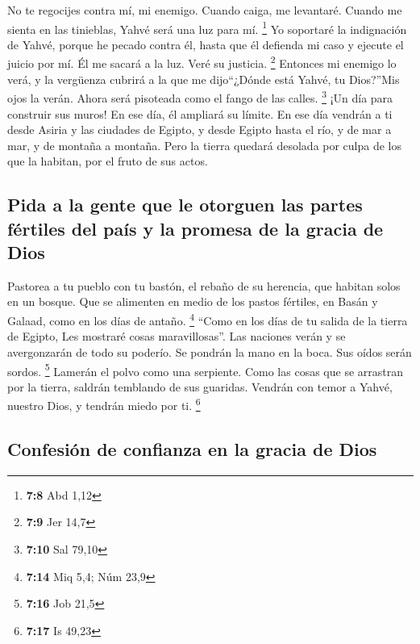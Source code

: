 \begin{paracol}{2}
 No te regocijes contra mí, mi enemigo. Cuando caiga, me
levantaré. Cuando me sienta en las tinieblas, Yahvé será una luz para
mí. \footnote{\textbf{7:8} Abd 1,12}  Yo soportaré la
indignación de Yahvé, porque he pecado contra él, hasta que él defienda
mi caso y ejecute el juicio por mí. Él me sacará a la luz. Veré su
justicia. \footnote{\textbf{7:9} Jer 14,7}  Entonces mi
enemigo lo verá, y la vergüenza cubrirá a la que me dijo``¿Dónde está
Yahvé, tu Dios?''Mis ojos la verán. Ahora será pisoteada como el fango
de las calles. \footnote{\textbf{7:10} Sal 79,10}  ¡Un
día para construir sus muros! En ese día, él ampliará su límite.
 En ese día vendrán a ti desde Asiria y las ciudades de
Egipto, y desde Egipto hasta el río, y de mar a mar, y de montaña a
montaña.  Pero la tierra quedará desolada por culpa de
los que la habitan, por el fruto de sus actos.

\hypertarget{pida-a-la-gente-que-le-otorguen-las-partes-fuxe9rtiles-del-pauxeds-y-la-promesa-de-la-gracia-de-dios}{%
\subsection{Pida a la gente que le otorguen las partes fértiles del país
y la promesa de la gracia de
Dios}\label{pida-a-la-gente-que-le-otorguen-las-partes-fuxe9rtiles-del-pauxeds-y-la-promesa-de-la-gracia-de-dios}}

 Pastorea a tu pueblo con tu bastón, el rebaño de su
herencia, que habitan solos en un bosque. Que se alimenten en medio de
los pastos fértiles, en Basán y Galaad, como en los días de antaño.
\footnote{\textbf{7:14} Miq 5,4; Núm 23,9}  ``Como en los
días de tu salida de la tierra de Egipto, Les mostraré cosas
maravillosas''.  Las naciones verán y se avergonzarán de
todo su poderío. Se pondrán la mano en la boca. Sus oídos serán sordos.
\footnote{\textbf{7:16} Job 21,5}  Lamerán el polvo como
una serpiente. Como las cosas que se arrastran por la tierra, saldrán
temblando de sus guaridas. Vendrán con temor a Yahvé, nuestro Dios, y
tendrán miedo por ti. \footnote{\textbf{7:17} Is 49,23}

\hypertarget{confesiuxf3n-de-confianza-en-la-gracia-de-dios}{%
\subsection{Confesión de confianza en la gracia de
Dios}\label{confesiuxf3n-de-confianza-en-la-gracia-de-dios}}


\end{paracol}
